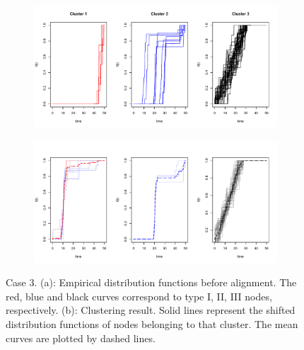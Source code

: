 \begin{figure}[H]
\begin{subfigure}{.8\textwidth}
\includegraphics[width=\linewidth]{../simulation/plots/f_list_3}
\caption{}
\label{fig: original curves, case 3}
\end{subfigure}
\begin{subfigure}{.8\textwidth}
\includegraphics[width=\linewidth]{../simulation/plots/clus_results_3}
\caption{}
\label{fig: aligned curves, case 3}
\end{subfigure}
\caption{Case 3. (a): Empirical distribution functions before alignment. The red, blue and black curves correspond to type I, II, III nodes, respectively. (b): Clustering result. Solid lines represent the shifted distribution functions of nodes belonging to that cluster. The mean curves are plotted by dashed lines. }
\end{figure}



